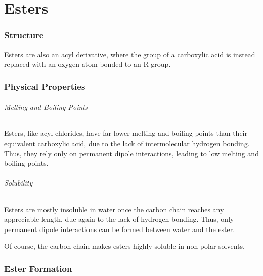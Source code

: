 

\pagebreak
\hypertarget{ChapterEsters}{}
\part{Esters}

	\section{Structure}

		Esters are also an acyl derivative, where the  group of a carboxylic acid is instead replaced with an oxygen atom
		bonded to an R group.





	\section{Physical Properties}

		\paragraph{Melting and Boiling Points}

		Esters, like acyl chlorides, have far lower melting and boiling points than their equivalent carboxylic acid, due to the lack of
		intermolecular hydrogen bonding. Thus, they rely only on permanent dipole interactions, leading to low melting and boiling points.


		\paragraph{Solubility}

		Esters are mostly insoluble in water once the carbon chain reaches any appreciable length, due again to the lack of hydrogen bonding.
		Thus, only permanent dipole interactions can be formed between water and the ester.

		Of course, the carbon chain makes esters highly soluble in non-polar solvents.



	\pagebreak
	\section{Ester Formation}

